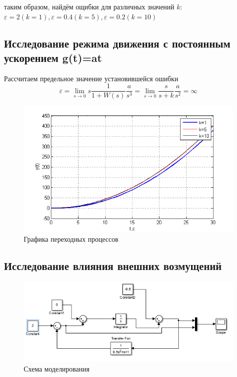 \documentclass[a4paper, 12pt]{article}
\begin{document}
таким образом, найдём ощибки для различных значений $k$:
$\varepsilon=2 (k=1), \varepsilon=0.4 (k=5), \varepsilon=0.2 (k=10)$

\subsection{Исследование режима движения с постоянным ускорением g(t)=at}\hfill\par

Рассчитаем предельное значение установившейся ошибки
\begin{equation}
\varepsilon  = \mathop {\lim }\limits_{s \to 0} s\frac{1}{{1 + W(s)}}\frac{a}{{{s^3}}} = \mathop {\lim }\limits_{s \to 0} \frac{s}{{s + k}}\frac{a}{{{s^2}}} = \infty
\end{equation}

\begin{center}
	\begin{figure}[h]
		\centering
		\includegraphics[width=0.95\linewidth]{8}
		\caption{Графика переходных процессов }
		\label{fig:8}
	\end{figure}
\end{center}
\clearpage
\begin{center}
	\section{Исследование влияния внешних возмущений}\hfill\par
\end{center}
\begin{figure}[h]
	\centering
	\includegraphics[width=0.95\linewidth]{9}
	\caption{Схема моделирования}
	\label{fig:9}
\end{figure}
\end{document}
